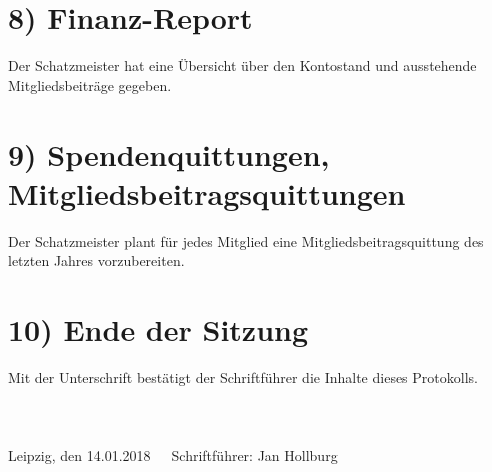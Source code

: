 \documentclass[10pt,a4paper]{scrartcl}
\newcommand{\eventdate}{14.01.2018}
\newcommand{\schriftfuehrer}{Jan Hollburg}
\begin{document}
\section*{8) Finanz-Report}
	Der Schatzmeister hat eine {\"U}bersicht über den Kontostand und ausstehende Mitgliedsbeitr{\"a}ge gegeben.

\section*{9) Spendenquittungen, Mitgliedsbeitragsquittungen}
	Der Schatzmeister plant f{\"u}r jedes Mitglied eine Mitgliedsbeitragsquittung des letzten Jahres vorzubereiten.

\section*{10) Ende der Sitzung}
    Mit der Unterschrift best{\"a}tigt der Schriftf{\"u}hrer die Inhalte dieses Protokolls.
\\
\\
\\
\\
Leipzig, den \eventdate \ \ \ Schriftf{\"u}hrer: \schriftfuehrer
\end{document}
